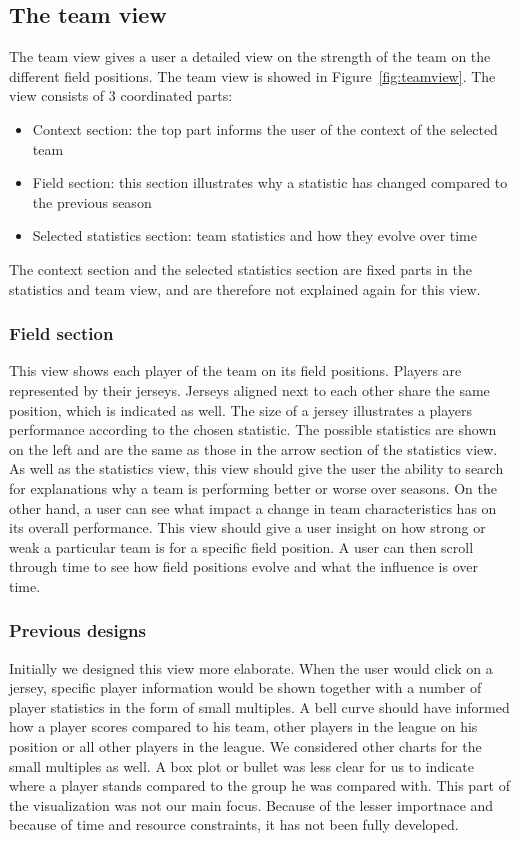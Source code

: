 \documentclass[chi_draft]{sigchi}
\begin{document}
\subsection{The team view}
The team view gives a user a detailed view on the strength of the team on the 
different field positions. The team view is showed in Figure~\ref{fig:teamview}. 
The view consists of 3 coordinated parts:
\begin{itemize}
    \item Context section: the top part informs the user of the context of the
        selected team
    \item Field section: this section illustrates why a statistic has changed
        compared to the previous season
    \item Selected statistics section: team statistics and how they evolve over
        time
\end{itemize}
The context section and the selected statistics section are fixed parts in the 
statistics and team view, and are therefore not explained again for this view.

\subsubsection{Field section}
This view shows each player of the team on its field positions. Players are
represented by their jerseys. Jerseys aligned next to each other share the same
position, which is indicated as well. The size of a jersey illustrates a
players performance according to the chosen statistic. The possible statistics 
are shown on the left and are the same as those in the arrow section of the 
statistics view. As well as the statistics view, this view should give the user 
the ability to search for explanations why a team is performing better or worse 
over seasons. On the other hand, a user can see what impact a change in team 
characteristics has on its overall performance. This view should give a user 
insight on how strong or weak a particular team is for a specific field position. 
A user can then scroll through time to see how field positions evolve and what 
the influence is over time.

\subsubsection{Previous designs}
Initially we designed this view more elaborate. When the user would click on a
jersey, specific player information would be shown together with a number of player
statistics in the form of small multiples. A bell curve should have informed
how a player scores compared to his team, other players in the league on his
position or all other players in the league. We considered other charts for the
small multiples as well. A box plot or bullet was less clear for us to indicate
where a player stands compared to the group he was compared with. This part of the 
visualization was not our main focus. Because of the lesser importnace and because of time and resource constraints, it has not been fully developed. 
\end{document}
